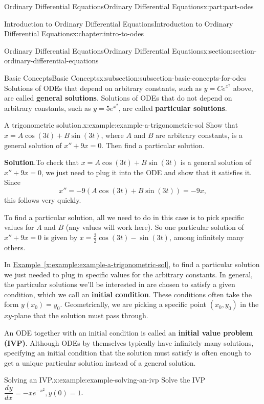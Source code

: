 \documentclass[twoside,10pt,]{book}
\newcommand{\blocktitlefont}{\relax}
\newcommand{\xreffont}{\relax}
\newcommand{\terminology}[1]{\textbf{#1}}
\numberwithin{equation}{part}
\providecommand{\dv}[3][]{\dfrac{d^{#1} #2}{d #3^{#1}}}
\begin{document}
\begin{partptx}{Ordinary Differential Equations}{}{Ordinary Differential Equations}{}{}{x:part:part-odes}
\begin{chapterptx}{Introduction to Ordinary Differential Equations}{}{Introduction to Ordinary Differential Equations}{}{}{x:chapter:intro-to-odes}
\begin{sectionptx}{Ordinary Differential Equations}{}{Ordinary Differential Equations}{}{}{x:section:section-ordinary-differential-equations}
\begin{subsectionptx}{Basic Concepts}{}{Basic Concepts}{}{}{x:subsection:subsection-basic-concepts-for-odes}
Solutions of ODEs that depend on arbitrary constants, such as \(y = Ce^{x^{2}}\) above, are called \terminology{general solutions}. Solutions of ODEs that do not depend on arbitrary constants, such as \(y = 5e^{x^{2}}\), are called \terminology{particular solutions}.%
\begin{example}{A trigonometric solution.}{x:example:example-a-trigonometric-sol}%
Show that \(x = A\cos(3t) + B\sin(3t)\), where \(A\) and \(B\) are arbitrary constants, is a general solution of \(x'' + 9x = 0\). Then find a particular solution.%
\par\smallskip%
\noindent\textbf{\blocktitlefont Solution}.\hypertarget{g:solution:idp105548816168864}{}\quad{}To check that \(x = A\cos(3t) + B\sin(3t)\) is a general solution of \(x''+9x = 0\), we just need to plug it into the ODE and show that it satisfies it. Since%
\begin{equation*}
x'' = -9(A\cos(3t)+B\sin(3t)) = -9x,
\end{equation*}
this follows very quickly.%
\par
To find a particular solution, all we need to do in this case is to pick specific values for \(A\) and \(B\) (any values will work here). So one particular solution of \(x''+9x = 0\) is given by \(x = \frac{3}{2}\cos(3t) - \sin(3t)\), among infinitely many others.%
\end{example}
In \hyperref[x:example:example-a-trigonometric-sol]{Example~{\xreffont\ref{x:example:example-a-trigonometric-sol}}}, to find a particular solution we just needed to plug in specific values for the arbitrary constants. In general, the particular solutions we'll be interested in are chosen to satisfy a given condition, which we call an \terminology{initial condition}. These conditions often take the form \(y(x_{0}) = y_{0}\). Geometrically, we are picking a specific point \((x_{0},y_{0})\) in the \(xy\)-plane that the solution must pass through.%
\par
An ODE together with an initial condition is called an \terminology{initial value problem (IVP)}. Although ODEs by themselves typically have infinitely many solutions, specifying an initial condition that the solution must satisfy is often enough to get a unique particular solution instead of a general solution.%
\begin{example}{Solving an IVP.}{x:example:example-solving-an-ivp}%
Solve the IVP \(\dv{y}{x} = -xe^{-x^{2}}, y(0)=1\).%
\par\smallskip%

\end{example}
\end{subsectionptx}
\end{sectionptx}
\end{chapterptx}
\end{partptx}
\end{document}
